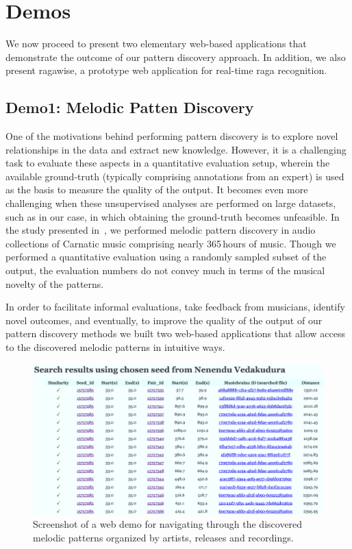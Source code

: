 \section{Demos}
\label{sec:demos}

We now proceed to present two elementary web-based applications that demonstrate the outcome of our pattern discovery approach. In addition, we also present \gls{ragawise}, a prototype web application for real-time \gls{raga} recognition. 

\subsection*{Demo1: Melodic Patten Discovery}

One of the motivations behind performing pattern discovery is to explore novel relationships in the data and extract new knowledge. However, it is a challenging task to evaluate these aspects in a quantitative evaluation setup, wherein the available ground-truth (typically comprising annotations from an expert) is used as the basis to measure the quality of the output. It becomes even more challenging when these unsupervised analyses are performed on large datasets, such as in our case, in which obtaining the ground-truth becomes unfeasible. In the study presented in~, we performed melodic pattern discovery in audio collections of Carnatic music comprising nearly 365\,hours of music. Though we performed a quantitative evaluation using a randomly sampled subset of the output, the evaluation numbers do not convey much in terms of the musical novelty of the patterns. 

In order to facilitate informal evaluations, take feedback from musicians, identify novel outcomes, and eventually, to improve the quality of the output of our pattern discovery methods we built two web-based applications that allow access to the discovered melodic patterns in intuitive ways. 

\begin{figure}
	\begin{center}
		\includegraphics[width=\figSizeHundred]{ch08_applications/figures/patternBrowsing1.png}
	\end{center}
	\caption[A web demo for navigating through the discovered melodic patterns]{Screenshot of a web demo for navigating through the discovered melodic patterns organized by artists, releases and recordings.}
	\label{fig:browser_patterns}
\end{figure}


